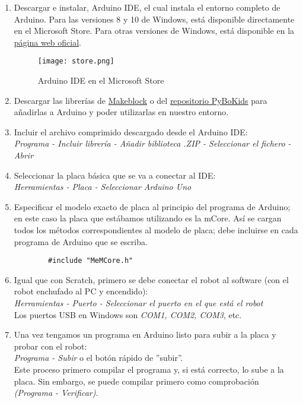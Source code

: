 \begin{enumerate}\label{list:InstalacionArduino}
	\item Descargar e instalar, Arduino IDE, el cual instala el entorno completo de Arduino. Para las versiones 8 y 10 de Windows, está disponible directamente en el Microsoft Store. Para otras versiones de Windows, está disponible en la  \href{https://www.arduino.cc/en/software}{página web oficial}.
	\begin{figure}[h]
		\texttt{[image: store.png]}
		\centering
		\label{img:MStore}
		\caption{Arduino IDE en el Microsoft Store}
	\end{figure}
	\item Descargar las librerías de \href{https://codeload.github.com/Makeblock-official/Makeblock-Libraries/zip/master}{Makeblock} o del \href{https://github.com/JdeRobot/PyBoKids/tree/main/PyBoKids%202.0}{repositorio PyBoKids} para añadirlas a Arduino y poder utilizarlas en nuestro entorno.
	\item Incluir el archivo comprimido descargado desde el Arduino IDE:\\ \textit{Programa - Incluir librería - Añadir biblioteca .ZIP - Seleccionar el fichero - Abrir}
	\item Seleccionar la placa básica que se va a conectar al IDE:\\
	\textit{Herramientas - Placa - Seleccionar Arduino Uno}
	\item Especificar el modelo exacto de placa al principio del programa de Arduino; en este caso la placa que estábamos utilizando es la mCore. Así se cargan todos los métodos correspondientes al modelo de placa; debe incluirse en cada programa de Arduino que se escriba.
	\begin{verbatim}	
		#include "MeMCore.h"	
	\end{verbatim}
	\item Igual que con Scratch, primero se debe conectar el robot al software (con el robot enchufado al PC y encendido):\\
	\textit{Herramientas - Puerto - Seleccionar el puerto en el que está el robot} \\
	Los puertos USB en Windows son \textit{COM1, COM2, COM3}, etc.
	\item  Una vez tengamos un programa en Arduino listo para subir a la placa y probar con el robot:\\
	\textit{Programa - Subir } o el botón rápido de ''subir''. \\
	Este proceso primero compilar el programa y, si está correcto, lo sube a la placa. Sin embargo, se puede compilar primero como comprobación \textit{(Programa - Verificar)}.
\end{enumerate}

